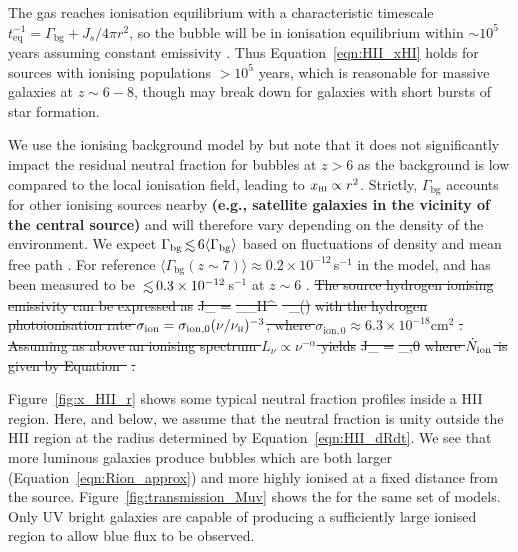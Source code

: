 \documentclass[fleqn,usenatbib]{mnras}
\providecommand{\DIFadd}[1]{{\protect\color{Green} \bf #1}} %
\providecommand{\DIFdel}[1]{{\protect\color{lightgray} \footnotesize \sout{#1}}} %
\providecommand{\DIFaddbegin}{} %
\providecommand{\DIFaddend}{} %
\providecommand{\DIFdelbegin}{} %
\providecommand{\DIFdelend}{} %
\newcommand{\DIFscaledelfig}{0.5}
\newlength{\DIFdelgraphicswidth} %
\newlength{\DIFdelgraphicsheight} %
\newcommand{\DIFaddincludegraphics}[2][]{{\color{blue}\fbox{\DIFOincludegraphics[#1]{#2}}}} %
\newcommand{\DIFdelincludegraphics}[2][]{%
\sbox{\DIFdelgraphicsbox}{\DIFOincludegraphics[#1]{#2}}%
\settoboxwidth{\DIFdelgraphicswidth}{\DIFdelgraphicsbox} %
\settoboxtotalheight{\DIFdelgraphicsheight}{\DIFdelgraphicsbox} %
\scalebox{\DIFscaledelfig}{%
\parbox[b]{\DIFdelgraphicswidth}{\usebox{\DIFdelgraphicsbox}\\[-\baselineskip] \rule{\DIFdelgraphicswidth}{0em}}\llap{\resizebox{\DIFdelgraphicswidth}{\DIFdelgraphicsheight}{%
\setlength{\unitlength}{\DIFdelgraphicswidth}%
\begin{picture}(1,1)%
\thicklines\linethickness{2pt} %
{\color[rgb]{1,0,0}\put(0,0){\framebox(1,1){}}}%
{\color[rgb]{1,0,0}\put(0,0){\line( 1,1){1}}}%
{\color[rgb]{1,0,0}\put(0,1){\line(1,-1){1}}}%
\end{picture}%
}\hspace*{3pt}}} %
} %
\DeclareRobustCommand{\DIFaddbegin}{\DIFOaddbegin \let\includegraphics\DIFaddincludegraphics} %
\DeclareRobustCommand{\DIFaddend}{\DIFOaddend \let\includegraphics\DIFOincludegraphics} %
\DeclareRobustCommand{\DIFdelbegin}{\DIFOdelbegin \let\includegraphics\DIFdelincludegraphics} %
\DeclareRobustCommand{\DIFdelend}{\DIFOaddend \let\includegraphics\DIFOincludegraphics} %
\begin{document}
\DIFaddend The gas reaches ionisation equilibrium with a characteristic timescale $t_\mathrm{eq}^{-1} = \Gamma_\mathrm{bg} + J_s/4\pi r^2$, so the bubble will be in ionisation equilibrium within $\sim10^5$ years assuming constant emissivity \citep[e.g.,][]{Davies2019}. Thus Equation~\eqref{eqn:HII_xHI} holds for sources with ionising populations $>10^5$ years, which is reasonable for massive galaxies at $z\sim6-8$, though may break down for galaxies with short bursts of star formation.

We use the ionising background model by \citet{Khaire2019} but note that it does not significantly impact the residual neutral fraction for bubbles at $z>6$ as the background is low compared to the local ionisation field, leading to $\xHI\propto r^2$. Strictly, $\Gamma_\textrm{bg}$ accounts for other ionising sources nearby \DIFaddbegin \DIFadd{(e.g., satellite galaxies in the vicinity of the central source) }\DIFaddend and will therefore vary depending on the density of the environment. We expect $\Gamma_\textrm{bg} \simlt 6 \langle \Gamma_\textrm{bg} \rangle$ based on fluctuations of density and mean free path \citep{MesingerDijkstra2008,Davies2016}. For reference $\langle \Gamma_\textrm{bg}(z\sim7) \rangle \approx 0.2\times10^{-12}$\,s$^{-1}$ in the \citet{Khaire2019} model, and has been measured to be $\simlt 0.3\times10^{-12}$\,s$^{-1}$ at $z\sim6$ \citep{Wyithe2010,Calverley2011}.
\DIFdelbegin \DIFdel{The source hydrogen ionising emissivity can be expressed as
}%
\DIFdel{J_ = }%
\DIFdel{\int_{\nu_H}^\infty \,}%
\DIFdel{\nu \,  \sigma_(\nu)
}%
\DIFdel{with the hydrogen photoionisation rate $\sigma_\mathrm{ion} = \sigma_{\mathrm{ion},0} (\nu/\nu_\textsc{h})^{-3}$, where $\sigma_{\mathrm{ion},0} \approx 6.3\times10^{-18}\textrm{cm}^2$ }%
\DIFdel{. Assuming as above an ionising spectrum $L_\nu \propto \nu^{-\alpha}$ yields
}%
\DIFdel{J_ = }%
\DIFdel{ \sigma_{,0}
}%
\DIFdel{where $\Nion$ is given by Equation~}%
\DIFdel{.
}\DIFdelend 

Figure~\ref{fig:x_HII_r} shows some typical neutral fraction profiles inside a HII region. Here, and below, we assume that the neutral fraction is unity outside the HII region at the radius determined by Equation~\ref{eqn:HII_dRdt}. We see that more luminous galaxies produce bubbles which are both larger (Equation~\ref{eqn:Rion_approx}) and more highly ionised at a fixed distance from the source. Figure~\ref{fig:transmission_Muv} shows the \lya for the same set of models. Only UV bright galaxies are capable of producing a sufficiently large ionised region to allow blue flux to be observed.
\end{document}
